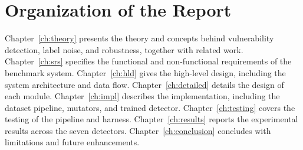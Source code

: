 \section{Organization of the Report}

Chapter~\ref{ch:theory} presents the theory and concepts behind vulnerability
detection, label noise, and robustness, together with related work.
Chapter~\ref{ch:srs} specifies the functional and non-functional requirements of
the benchmark system. Chapter~\ref{ch:hld} gives the high-level design,
including the system architecture and data flow. Chapter~\ref{ch:detailed}
details the design of each module. Chapter~\ref{ch:impl} describes the
implementation, including the dataset pipeline, mutators, and trained detector.
Chapter~\ref{ch:testing} covers the testing of the pipeline and harness.
Chapter~\ref{ch:results} reports the experimental results across the seven
detectors. Chapter~\ref{ch:conclusion} concludes with limitations and future
enhancements.
